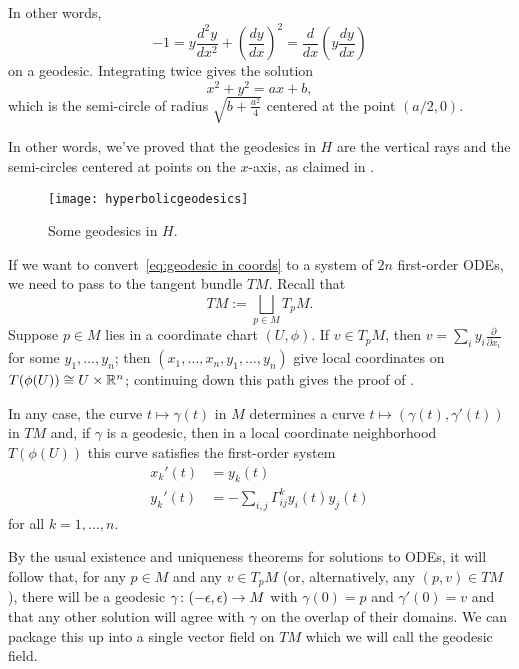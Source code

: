 \begin{example}
	In other words,
	\[
		-1 = y \frac{d^2y}{dx^2} + \left(\frac{dy}{dx}\right)^2 = \frac{d}{dx} \left( y \frac{dy}{dx} \right)
	\]
	on a geodesic. Integrating twice gives the solution
	\[
		x^2 + y^2 = ax + b,
	\]
	which is the semi-circle of radius $\sqrt{b+\frac{a^2}{4}}$ centered at the point $(a/2,0)$.
	
	In other words, we've proved that the geodesics in $H$ are the vertical rays and the semi-circles centered at points on the $x$-axis, as claimed in .
	
	\begin{figure}[htbp]
		\centering
			\texttt{[image: hyperbolicgeodesics]}
		\caption{Some geodesics in $H$.}
		\label{fig:hyperbolicgeodesics2}
	\end{figure}
\end{example}

If we want to convert~\eqref{eq:geodesic in coords} to a system of $2n$ first-order ODEs, we need to pass to the tangent bundle $TM$. Recall that
\[
	TM := \bigsqcup_{p \in M} T_pM.
\]
Suppose $p \in M$ lies in a coordinate chart $(U,\phi)$. If $v \in T_p M$, then $v = \sum_i y_i \frac{\partial}{\partial x_i}$ for some $y_1, \dots , y_n$; then $(x_1, \dots , x_n, y_1, \dots , y_n)$ give local coordinates on $T(\phi(U)) \cong U \times \mathbb{R}^n$; continuing down this path gives the proof of .

In any case, the curve $t \mapsto \gamma(t)$ in $M$ determines a curve $t \mapsto (\gamma(t),\gamma'(t))$ in $TM$ and, if $\gamma$ is a geodesic, then in a local coordinate neighborhood $T(\phi(U))$ this curve satisfies the first-order system
\begin{align}\label{eq:first-order geodesic}
	x_k'(t) & = y_k(t) \\
	y_k'(t) & = -\sum_{i,j} \Gamma_{ij}^k y_i(t)y_j(t) \nonumber
\end{align}
for all $k =1 , \dots , n$.

By the usual existence and uniqueness theorems for solutions to ODEs, it will follow that, for any $p \in M$ and any $v \in T_pM$ (or, alternatively, any $(p,v) \in TM$), there will be a geodesic $\gamma \colon\thinspace\! (-\epsilon,\epsilon) \to M$ with $\gamma(0) = p$ and $\gamma'(0) = v$ and that any other solution will agree with $\gamma$ on the overlap of their domains. We can package this up into a single vector field on $TM$ which we will call the geodesic field.

